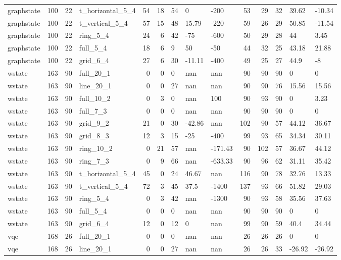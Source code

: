 \begin{longtable}{lrrlrrlllrrlll}
graphstate & 100 & 22 & t\_horizontal\_5\_4 & 54 & 18 & 54 & 0 & -200 & 53 & 29 & 32 & 39.62 & -10.34 \\
graphstate & 100 & 22 & t\_vertical\_5\_4 & 57 & 15 & 48 & 15.79 & -220 & 59 & 26 & 29 & 50.85 & -11.54 \\
graphstate & 100 & 22 & ring\_5\_4 & 24 & 6 & 42 & -75 & -600 & 50 & 29 & 28 & 44 & 3.45 \\
graphstate & 100 & 22 & full\_5\_4 & 18 & 6 & 9 & 50 & -50 & 44 & 32 & 25 & 43.18 & 21.88 \\
graphstate & 100 & 22 & grid\_6\_4 & 27 & 6 & 30 & -11.11 & -400 & 49 & 25 & 27 & 44.9 & -8 \\
wstate & 163 & 90 & full\_20\_1 & 0 & 0 & 0 & nan & nan & 90 & 90 & 90 & 0 & 0 \\
wstate & 163 & 90 & line\_20\_1 & 0 & 0 & 27 & nan & nan & 90 & 90 & 76 & 15.56 & 15.56 \\
wstate & 163 & 90 & full\_10\_2 & 0 & 3 & 0 & nan & 100 & 90 & 93 & 90 & 0 & 3.23 \\
wstate & 163 & 90 & full\_7\_3 & 0 & 0 & 0 & nan & nan & 90 & 90 & 90 & 0 & 0 \\
wstate & 163 & 90 & grid\_9\_2 & 21 & 0 & 30 & -42.86 & nan & 102 & 90 & 57 & 44.12 & 36.67 \\
wstate & 163 & 90 & grid\_8\_3 & 12 & 3 & 15 & -25 & -400 & 99 & 93 & 65 & 34.34 & 30.11 \\
wstate & 163 & 90 & ring\_10\_2 & 0 & 21 & 57 & nan & -171.43 & 90 & 102 & 57 & 36.67 & 44.12 \\
wstate & 163 & 90 & ring\_7\_3 & 0 & 9 & 66 & nan & -633.33 & 90 & 96 & 62 & 31.11 & 35.42 \\
wstate & 163 & 90 & t\_horizontal\_5\_4 & 45 & 0 & 24 & 46.67 & nan & 116 & 90 & 78 & 32.76 & 13.33 \\
wstate & 163 & 90 & t\_vertical\_5\_4 & 72 & 3 & 45 & 37.5 & -1400 & 137 & 93 & 66 & 51.82 & 29.03 \\
wstate & 163 & 90 & ring\_5\_4 & 0 & 3 & 42 & nan & -1300 & 90 & 93 & 58 & 35.56 & 37.63 \\
wstate & 163 & 90 & full\_5\_4 & 0 & 0 & 0 & nan & nan & 90 & 90 & 90 & 0 & 0 \\
wstate & 163 & 90 & grid\_6\_4 & 12 & 0 & 12 & 0 & nan & 99 & 90 & 59 & 40.4 & 34.44 \\
vqe & 168 & 26 & full\_20\_1 & 0 & 0 & 0 & nan & nan & 26 & 26 & 26 & 0 & 0 \\
vqe & 168 & 26 & line\_20\_1 & 0 & 0 & 27 & nan & nan & 26 & 26 & 33 & -26.92 & -26.92 \\

\end{longtable}
